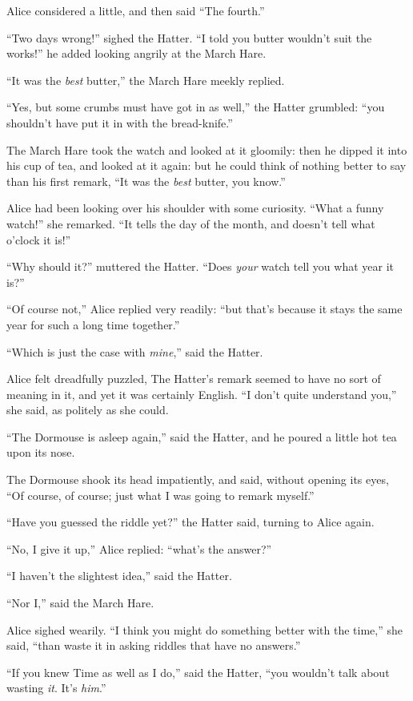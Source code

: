 \documentclass[11pt,openany,oneside]{book}
\begin{document}
Alice considered a little, and then said “The fourth.” 

“Two days wrong!” sighed the Hatter. “I told you butter wouldn’t suit the works!” he added looking angrily at the March Hare. 

“It was the {\em best\/} butter,” the March Hare meekly replied. 

“Yes, but some crumbs must have got in as well,” the Hatter grumbled: “you shouldn’t have put it in with the bread-knife.” 

The March Hare took the watch and looked at it gloomily: then he dipped it into his cup of tea, and looked at it again: but he could think of nothing better to say than his first remark, “It was the {\em best\/} butter, you know.” 

Alice had been looking over his shoulder with some curiosity. “What a funny watch!” she remarked. “It tells the day of the month, and doesn’t tell what o’clock it is!” 

“Why should it?” muttered the Hatter. “Does {\em your\/} watch tell you what year it is?” 

“Of course not,” Alice replied very readily: “but that’s because it stays the same year for such a long time together.” 

“Which is just the case with {\em mine\/},” said the Hatter. 

Alice felt dreadfully puzzled, The Hatter’s remark seemed to have no sort of meaning in it, and yet it was certainly English. “I don’t quite understand you,” she said, as politely as she could. 

“The Dormouse is asleep again,” said the Hatter, and he poured a little hot tea upon its nose. 

The Dormouse shook its head impatiently, and said, without opening its eyes, “Of course, of course; just what I was going to remark myself.” 

“Have you guessed the riddle yet?” the Hatter said, turning to Alice again. 

“No, I give it up,” Alice replied: “what’s the answer?” 

“I haven’t the slightest idea,” said the Hatter. 

“Nor I,” said the March Hare. 

Alice sighed wearily. “I think you might do something better with the time,” she said, “than waste it in asking riddles that have no answers.” 

“If you knew Time as well as I do,” said the Hatter, “you wouldn’t talk about wasting {\em it\/}. It’s {\em him\/}.” 
\end{document}
